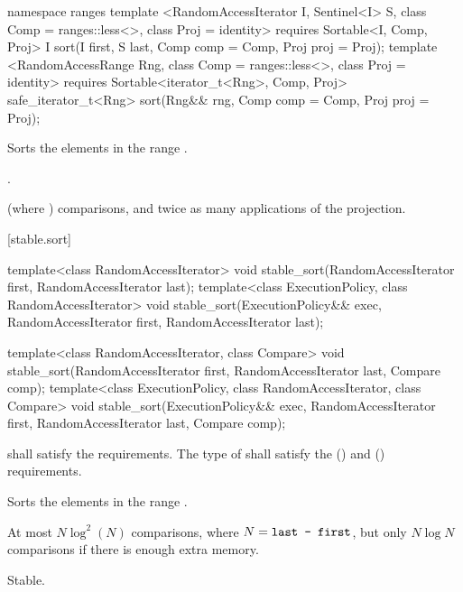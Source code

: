 \begin{addedblock}
%
\begin{itemdecl}
namespace ranges {
  template <RandomAccessIterator I, Sentinel<I> S, class Comp = ranges::less<>,
            class Proj = identity>
      requires Sortable<I, Comp, Proj>
    I sort(I first, S last, Comp comp = Comp{}, Proj proj = Proj{});
  template <RandomAccessRange Rng, class Comp = ranges::less<>, class Proj = identity>
      requires Sortable<iterator_t<Rng>, Comp, Proj>
    safe_iterator_t<Rng> sort(Rng&& rng, Comp comp = Comp{}, Proj proj = Proj{});
}
\end{itemdecl}

\begin{itemdescr}
\pnum
\effects
Sorts the elements in the range
.

\pnum
\returns {}.

\pnum
\complexity
{}
(where
)
comparisons, and twice as many applications of the projection.
\end{itemdescr}
\end{addedblock}

[stable.sort]{}

%
\begin{itemdecl}
template<class RandomAccessIterator>
  void stable_sort(RandomAccessIterator first, RandomAccessIterator last);
template<class ExecutionPolicy, class RandomAccessIterator>
  void stable_sort(ExecutionPolicy&& exec,
                   RandomAccessIterator first, RandomAccessIterator last);

template<class RandomAccessIterator, class Compare>
  void stable_sort(RandomAccessIterator first, RandomAccessIterator last,
                   Compare comp);
template<class ExecutionPolicy, class RandomAccessIterator, class Compare>
  void stable_sort(ExecutionPolicy&& exec,
                   RandomAccessIterator first, RandomAccessIterator last,
                   Compare comp);
\end{itemdecl}

\begin{itemdescr}
\pnum
\requires
{} shall satisfy the
 requirements. The type
of  shall satisfy the
 () and
 () requirements.

\pnum
\effects
Sorts the elements in the range .

\pnum
\complexity
At most $N \log^2(N)$
comparisons, where
$N = \texttt{last - first}$, but only $N \log N$ comparisons if there is enough extra memory.

\pnum
\remarks Stable.
\end{itemdescr}

